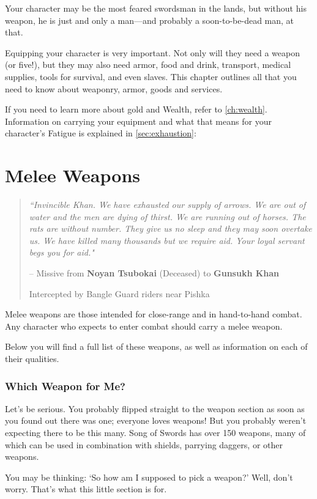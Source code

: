 \documentclass[oneside,11pt,english]{book}
\begin{document}
Your character may be the most feared swordsman in the lands, but without his weapon, he is just and 
only a man—and probably a soon-to-be-dead man, at that. 
 

Equipping your character is very important. Not only will they need a weapon (or five!), but they may 
also need armor, food and drink, transport, medical supplies, tools for survival, and even slaves. This 
chapter outlines all that you need to know about weaponry, armor, goods and services. 
 

If you need to learn more about gold and Wealth, refer to \autoref{ch:wealth}. Information on carrying your equipment and what that means for your character’s Fatigue is explained in \autoref{sec:exhaustion}:~
\chapter{Melee Weapons}\label{ch:Melee Weapons}
\startcontents[chapters]
\clearpage
\begin{quote}
	\emph{“Invincible Khan. We have exhausted our supply of arrows. We are out of water and the men are dying of thirst. We are running out of horses. The rats are without number. They give us no sleep and they may soon overtake us. We have killed many thousands but we require aid. Your loyal servant begs you for aid."}
	
	\hfill -- Missive from \textbf{Noyan Tsubokai} (Deceased) to \textbf{Gunsukh Khan}\par
	\hfill Intercepted by Bangle Guard riders near Pishka 
\end{quote}
Melee weapons are those intended for close-range and in hand-to-hand combat. Any character who expects to enter 
combat should carry a melee weapon. 

Below you will find a full list of these weapons, as well as information on each of their qualities.

\subsection{Which Weapon for Me?}
Let’s be serious. You probably flipped straight to the weapon section as soon as you found out there was one; 
everyone loves weapons! But you probably weren’t expecting there to be this many. Song of Swords has over 150 
weapons, many of which can be used in combination with shields, parrying daggers, or other weapons. 

You may be thinking: ‘So how am I supposed to pick a weapon?’ Well, don’t worry. That’s what this little section is 
for.
\end{document}
